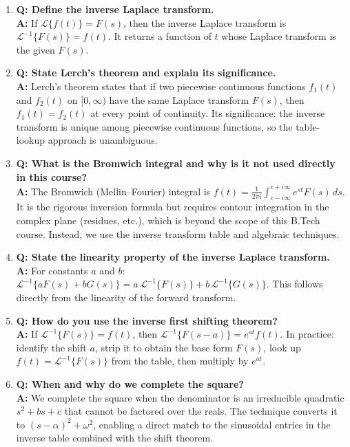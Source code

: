 \documentclass[12pt,a4paper]{article}
\begin{document}
\begin{enumerate}

\item \textbf{Q: Define the inverse Laplace transform.}\\
\textbf{A:} If $\mathcal{L}\{f(t)\} = F(s)$, then the inverse Laplace transform
is $\mathcal{L}^{-1}\{F(s)\} = f(t)$. It returns a function of $t$ whose
Laplace transform is the given $F(s)$.

\item \textbf{Q: State Lerch's theorem and explain its significance.}\\
\textbf{A:} Lerch's theorem states that if two piecewise continuous functions
$f_1(t)$ and $f_2(t)$ on $[0,\infty)$ have the same Laplace transform
$F(s)$, then $f_1(t) = f_2(t)$ at every point of continuity. Its
significance: the inverse transform is unique among piecewise continuous
functions, so the table-lookup approach is unambiguous.

\item \textbf{Q: What is the Bromwich integral and why is it not used directly in
this course?}\\
\textbf{A:} The Bromwich (Mellin--Fourier) integral is
$f(t) = \frac{1}{2\pi i}\int_{c-i\infty}^{c+i\infty}e^{st}F(s)\,ds$.
It is the rigorous inversion formula but requires contour integration in the
complex plane (residues, etc.), which is beyond the scope of this B.Tech
course. Instead, we use the inverse transform table and algebraic techniques.

\item \textbf{Q: State the linearity property of the inverse Laplace transform.}\\
\textbf{A:} For constants $a$ and $b$:
$\mathcal{L}^{-1}\{aF(s)+bG(s)\} = a\,\mathcal{L}^{-1}\{F(s)\}+b\,\mathcal{L}^{-1}\{G(s)\}$.
This follows directly from the linearity of the forward transform.

\item \textbf{Q: How do you use the inverse first shifting theorem?}\\
\textbf{A:} If $\mathcal{L}^{-1}\{F(s)\}=f(t)$, then
$\mathcal{L}^{-1}\{F(s-a)\}=e^{at}f(t)$. In practice: identify the shift
$a$, strip it to obtain the base form $F(s)$, look up $f(t) = \mathcal{L}^{-1}\{F(s)\}$
from the table, then multiply by $e^{at}$.

\item \textbf{Q: When and why do we complete the square?}\\
\textbf{A:} We complete the square when the denominator is an irreducible
quadratic $s^2+bs+c$ that cannot be factored over the reals. The technique
converts it to $(s-\alpha)^2+\omega^2$, enabling a direct match to the
sinusoidal entries in the inverse table combined with the shift theorem.


\end{enumerate}
\end{document}

